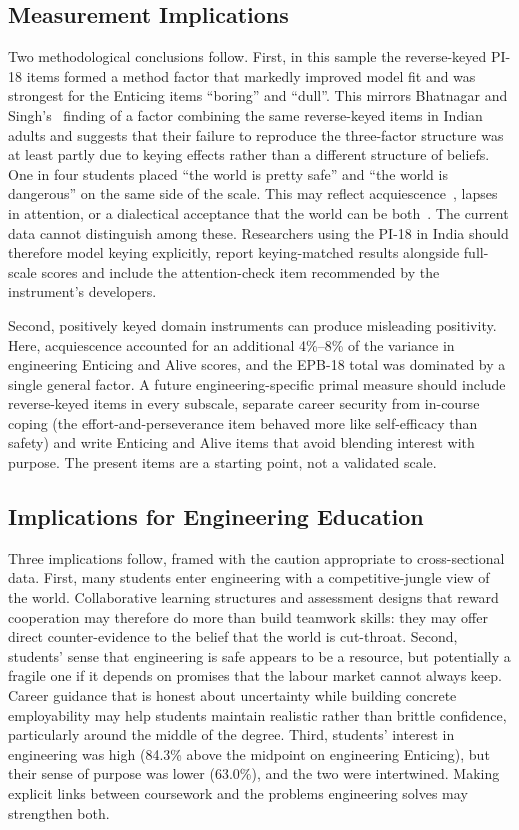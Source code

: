 \documentclass[journal,a4paper]{IEEEtran}
\begin{document}
\subsection{Measurement Implications}

Two methodological conclusions follow. First, in this sample the reverse-keyed PI-18 items formed a method factor that markedly improved model fit and was strongest for the Enticing items ``boring'' and ``dull''. This mirrors Bhatnagar and Singh's~\cite{bhatnagar2024} finding of a factor combining the same reverse-keyed items in Indian adults and suggests that their failure to reproduce the three-factor structure was at least partly due to keying effects rather than a different structure of beliefs. One in four students placed ``the world is pretty safe'' and ``the world is dangerous'' on the same side of the scale. This may reflect acquiescence~\cite{smith2004}, lapses in attention, or a dialectical acceptance that the world can be both~\cite{spencer2010}. The current data cannot distinguish among these. Researchers using the PI-18 in India should therefore model keying explicitly, report keying-matched results alongside full-scale scores and include the attention-check item recommended by the instrument's developers.

Second, positively keyed domain instruments can produce misleading positivity. Here, acquiescence accounted for an additional 4\%–8\% of the variance in engineering Enticing and Alive scores, and the EPB-18 total was dominated by a single general factor. A future engineering-specific primal measure should include reverse-keyed items in every subscale, separate career security from in-course coping (the effort-and-perseverance item behaved more like self-efficacy than safety) and write Enticing and Alive items that avoid blending interest with purpose. The present items are a starting point, not a validated scale.

\subsection{Implications for Engineering Education}

Three implications follow, framed with the caution appropriate to cross-sectional data. First, many students enter engineering with a competitive-jungle view of the world. Collaborative learning structures and assessment designs that reward cooperation may therefore do more than build teamwork skills: they may offer direct counter-evidence to the belief that the world is cut-throat. Second, students' sense that engineering is safe appears to be a resource, but potentially a fragile one if it depends on promises that the labour market cannot always keep. Career guidance that is honest about uncertainty while building concrete employability may help students maintain realistic rather than brittle confidence, particularly around the middle of the degree. Third, students' interest in engineering was high (84.3\% above the midpoint on engineering Enticing), but their sense of purpose was lower (63.0\%), and the two were intertwined. Making explicit links between coursework and the problems engineering solves may strengthen both.
\end{document}
